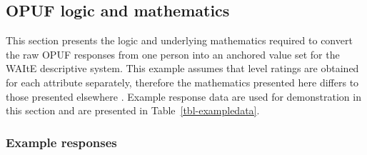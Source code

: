 \documentclass[
  number,
  preprint]{elsarticle}
\begin{document}
\subsection{OPUF logic and mathematics}\label{sec-OPUF_methods}

This section presents the logic and underlying mathematics required to
convert the raw OPUF responses from one person into an anchored value
set for the WAItE descriptive system. This example assumes that level
ratings are obtained for each attribute separately, therefore the
mathematics presented here differs to those presented elsewhere
\citep{Schneider2022TheStates}. Example response data are used for
demonstration in this section and are presented in
Table~\ref{tbl-exampledata}.

\newpage

\subsubsection{Example responses}\label{example-responses}
\end{document}
